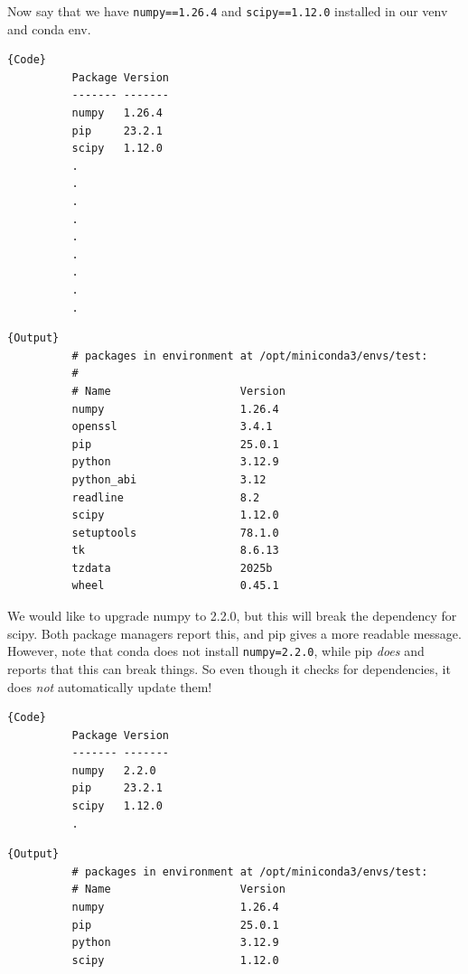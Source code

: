 \documentclass{article}
\begin{document}
    \begin{example}
      Now say that we have \texttt{numpy==1.26.4} and \texttt{scipy==1.12.0} installed in our venv and conda env. 

      \noindent\begin{minipage}{.35\textwidth}
        \begin{lstlisting}[]{Code}
          Package Version
          ------- -------
          numpy   1.26.4
          pip     23.2.1
          scipy   1.12.0 
          .
          .
          .
          .
          .
          .
          .
          .
          .
        \end{lstlisting}
        \end{minipage}
        \hfill
        \begin{minipage}{.64\textwidth}
        \begin{lstlisting}[]{Output}
          # packages in environment at /opt/miniconda3/envs/test:
          #
          # Name                    Version   
          numpy                     1.26.4    
          openssl                   3.4.1     
          pip                       25.0.1    
          python                    3.12.9    
          python_abi                3.12      
          readline                  8.2       
          scipy                     1.12.0    
          setuptools                78.1.0    
          tk                        8.6.13    
          tzdata                    2025b     
          wheel                     0.45.1    
        \end{lstlisting}
      \end{minipage}

      We would like to upgrade numpy to 2.2.0, but this will break the dependency for scipy. Both package managers report this, and pip gives a more readable message. However, note that conda does not install \texttt{numpy=2.2.0}, while pip \textit{does} and reports that this can break things. So even though it checks for dependencies, it does \textit{not} automatically update them!

      \noindent\begin{minipage}{.35\textwidth}
        \begin{lstlisting}[]{Code}
          Package Version
          ------- -------
          numpy   2.2.0
          pip     23.2.1
          scipy   1.12.0 
          .
        \end{lstlisting}
        \end{minipage}
        \hfill
        \begin{minipage}{.64\textwidth}
        \begin{lstlisting}[]{Output}
          # packages in environment at /opt/miniconda3/envs/test:
          # Name                    Version   
          numpy                     1.26.4    
          pip                       25.0.1    
          python                    3.12.9    
          scipy                     1.12.0    
        \end{lstlisting}
      \end{minipage}
    \end{example}
\end{document}
